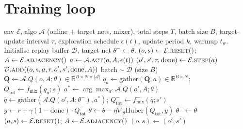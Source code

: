 \documentclass[manuscript, screen, review]{jair}
\newcommand{\algoname}[1]{\textsc{#1}}
\newcommand{\iql}{\algoname{IQL}}
\newcommand{\Aagent}{\mathcal{A}}
\begin{document}

\printbibliography

\appendix


\section{Training loop}
\label{app:trainloop}

\begin{algorithm}[!ht]
\caption{Shared training loop (CTDE, off-policy, Double-DQN). For \iql,
the team-loss line is replaced by a per-agent Huber sum (see
Section~\ref{sec:algos}).}
\label{alg:train}
\begin{algorithmic}[1]
\Require env $\mathcal{E}$, algo $\mathcal{A}$ (online + target nets, mixer),
  total steps $T$, batch size $B$, target-update interval $\tau$,
  exploration schedule $\epsilon(t)$, update period $k$, warmup $t_{\text{w}}$.
\State Initialise replay buffer $\mathcal{D}$, target net $\theta^- \leftarrow \theta$.
\State $(o, s) \leftarrow \mathcal{E}.\textsc{reset}()$;\; $A \leftarrow \mathcal{E}.\textsc{adjacency}()$
  \State $a \leftarrow \mathcal{A}.\textsc{act}(o, A, \epsilon(t))$
  \State $(o', s', r, \text{done}) \leftarrow \mathcal{E}.\textsc{step}(a)$
  \State $\mathcal{D}.\textsc{add}((o, s, a, r, o', s', \text{done}, A))$
    \State $\text{batch} \sim \mathcal{D}$ \quad (size $B$)
    \State $\mathbf{Q} \leftarrow \mathcal{A}.Q(o, A; \theta) \in \mathbb{R}^{B \times N \times |\Aagent|}$
    \State $q_a \leftarrow \mathrm{gather}(\mathbf{Q}, a) \in \mathbb{R}^{B \times N}$;\;
           $Q_{\text{tot}} \leftarrow f_{\text{mix}}(q_a; s)$
    \State $a^* \leftarrow \arg\max_{a'} \mathcal{A}.Q(o', A; \theta)$
    \State $\bar q \leftarrow \mathrm{gather}(\mathcal{A}.Q(o', A; \theta^-), a^*)$;\;
           $Q^{-}_{\text{tot}} \leftarrow f_{\text{mix}}^{-}(\bar q; s')$
    \State $y \leftarrow r + \gamma (1{-}\text{done}) \cdot Q^{-}_{\text{tot}}$
    \State $\theta \leftarrow \theta - \eta \nabla_\theta \mathrm{Huber}(Q_{\text{tot}}, y)$
     $\theta^- \leftarrow \theta$ \EndIf
  \EndIf
   $(o, s) \leftarrow \mathcal{E}.\textsc{reset}()$;\; $A \leftarrow \mathcal{E}.\textsc{adjacency}()$
  \Else \;$(o, s) \leftarrow (o', s')$
  \EndIf
\EndFor
\end{algorithmic}
\end{algorithm}
\end{document}
